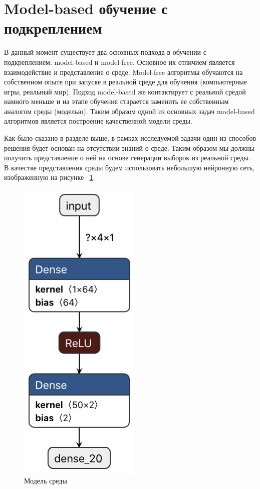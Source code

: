 \section{Model-based обучение с подкреплением}\label{1sec:optimal-control}

В данный момент существует два основных подхода в обучении с подкреплением: model-based и model-free. Основное их отличием является взаимодействие и представление о среде. Model-free алгоритмы обучаются на собственном опыте при запуске в реальной среде для обучения (компьютерные игры, реальный мир). Подход model-based же контактирует с реальной средой намного меньше и на этапе обучения старается заменить ее собственным аналогом среды (моделью). Таким образом одной из основных задач model-based алгоритмов является построение качественной модели среды.

Как было сказано в разделе выше, в рамках исследуемой задачи один из способов решения будет основан на отсутствии знаний о среде. Таким образом мы должны получить представление о ней на основе генерации выборок из реальной среды. В качестве представления среды будем использовать небольшую нейронную сеть, изображенную на рисунке ~\ref{fig:nn-new}. \newpage

 \begin{figure}[h]
 	\centering
 	\includegraphics[scale=0.65]{nn_new.jpeg}
 	\caption {Модель среды}
 	\label{fig:nn-new}
 \end{figure}

